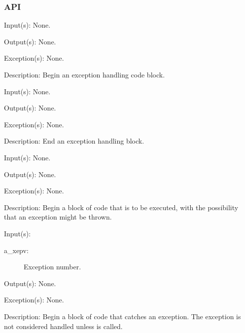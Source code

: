 \subsubsection{API}
\begin{capi}
\label{xep_begin}
	\begin{capilist}
	\item[Input(s): ] None.
	\item[Output(s): ] None.
	\item[Exception(s): ] None.
	\item[Description: ]
		Begin an exception handling code block.
	\end{capilist}
\label{xep_end}
	\begin{capilist}
	\item[Input(s): ] None.
	\item[Output(s): ] None.
	\item[Exception(s): ] None.
	\item[Description: ]
		End an exception handling block.
	\end{capilist}
\label{xep_try}
	\begin{capilist}
	\item[Input(s): ] None.
	\item[Output(s): ] None.
	\item[Exception(s): ] None.
	\item[Description: ]
		Begin a block of code that is to be executed, with the
		possibility that an exception might be thrown.
	\end{capilist}
\label{xep_catch}
	\begin{capilist}
	\item[Input(s): ]
		\begin{description}\item[]
		\item[a\_xepv: ]
			Exception number.
		\end{description}
	\item[Output(s): ] None.
	\item[Exception(s): ] None.
	\item[Description: ]
		Begin a block of code that catches an exception.  The exception
		is not considered handled unless  is
		called.

\end{capilist}
\end{capi}
